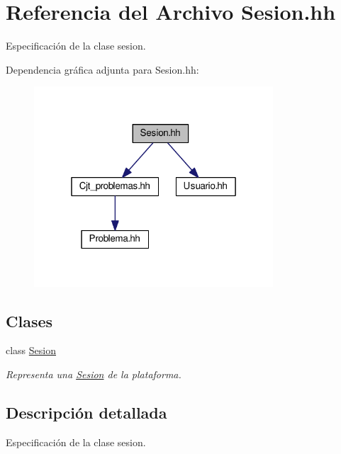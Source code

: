 \hypertarget{_sesion_8hh}{}\section{Referencia del Archivo Sesion.\+hh}
\label{_sesion_8hh}


Especificación de la clase sesion.  


Dependencia gráfica adjunta para Sesion.\+hh\+:
\nopagebreak
\begin{figure}[H]
\begin{center}
\leavevmode
\includegraphics[width=253pt]{_sesion_8hh__incl}
\end{center}
\end{figure}
\subsection*{Clases}
\begin{DoxyCompactItemize}
\item 
class \mbox{\hyperlink{class_sesion}{Sesion}}
\begin{DoxyCompactList}\small\item\em Representa una \mbox{\hyperlink{class_sesion}{Sesion}} de la plataforma. \end{DoxyCompactList}\end{DoxyCompactItemize}


\subsection{Descripción detallada}
Especificación de la clase sesion. 


